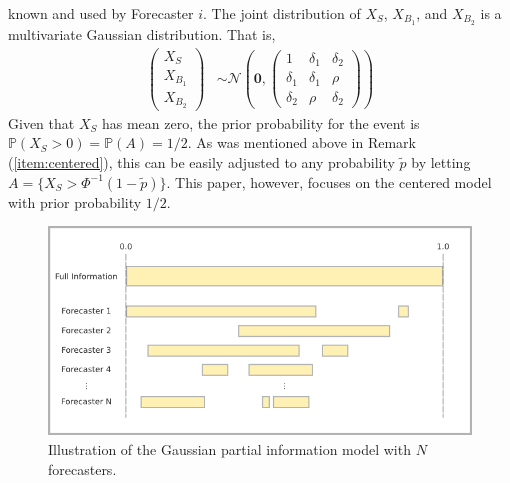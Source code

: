\documentclass[11pt]{article}
\renewcommand{\P}{\mathbb{P}}
\theoremstyle{definition}
\theoremstyle{definition}
\def\P{{\mathbb P}}
\begin{document}
known and used by Forecaster $i$.
 The joint distribution of $X_{S}$, $X_{B_1}$, and $X_{B_2}$ is a
multivariate Gaussian distribution.  That is,
\begin{align}
\left(\begin{matrix} X_S \\ X_{B_1}\\ X_{B_2} \end{matrix}\right) 
 &\sim \mathcal{N}\left(
 \boldsymbol{0},  \left(\begin{matrix} 
1 & \delta_1 & \delta_2\\
\delta_1 & \delta_1 &\rho\\
\delta_2 & \rho & \delta_2
 \end{matrix}\right)\right) \label{twoforecasters}
\end{align}
Given that $X_S$ has mean zero, the prior probability for the event is
$\P(X_S > 0) = \P(A) = 1/2$.  As was mentioned above in Remark
(\ref{item:centered}), this can be easily adjusted to any probability
$\tilde{p}$ by letting $A = \{ X_S > \Phi^{-1}(1-\tilde{p}) \}$.  This
paper, however, focuses on the centered model with prior probability
$1/2$.

\begin{figure}[htbp]
   \includegraphics[width = \textwidth]{N=N} %
   \caption{Illustration of the Gaussian partial information model with $N$ forecasters.}
   \label{diagramN}
\end{figure}
\end{document}
